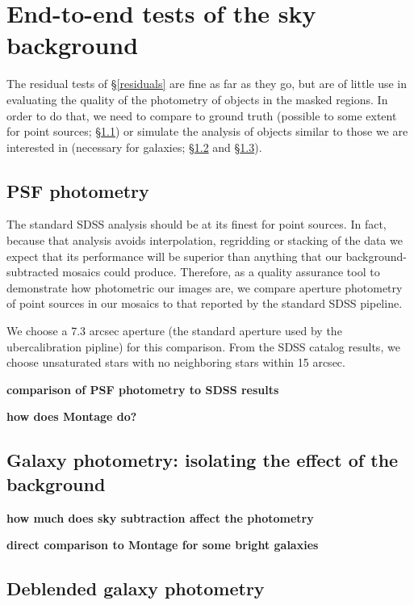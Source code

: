 \documentclass[10pt,preprint]{aastex}
\begin{document}
\section{ End-to-end tests of the sky background}
\label{sec:endtoend}

The residual tests of \S\ref{residuals} are fine as far as they go,
but are of little use in evaluating the quality of the photometry of
objects in the masked regions.  In order to do that, we need to
compare to ground truth (possible to some extent for point sources;
\S\ref{sec:psfs}) or simulate the analysis of objects similar to
those we are interested in (necessary for galaxies;
\S\ref{sec:simplegal} and \S\ref{sec:deblendgal}).

\subsection{ PSF photometry}
\label{sec:psfs}

The standard SDSS analysis should be at its finest for point sources.
In fact, because that analysis avoids interpolation, regridding or
stacking of the data we expect that its performance will be superior
than anything that our background-subtracted mosaics could
produce. Therefore, as a quality assurance tool to demonstrate how
photometric our images are, we compare aperture photometry of
point sources in our mosaics to that reported by the standard SDSS
pipeline. 

We choose a 7.3 arcsec aperture (the standard aperture used by the
ubercalibration pipline) for this comparison. From the SDSS catalog
results, we choose unsaturated stars with no neighboring stars within
15 arcsec. 


{\bf comparison of PSF photometry to SDSS results}

{\bf how does Montage do?}

\subsection{ Galaxy photometry: isolating the effect of the background}
\label{sec:simplegal}

{\bf how much does sky subtraction affect the photometry}

{\bf direct comparison to Montage for some bright galaxies}

\subsection{ Deblended galaxy photometry}
\label{sec:deblendgal}
\end{document}
